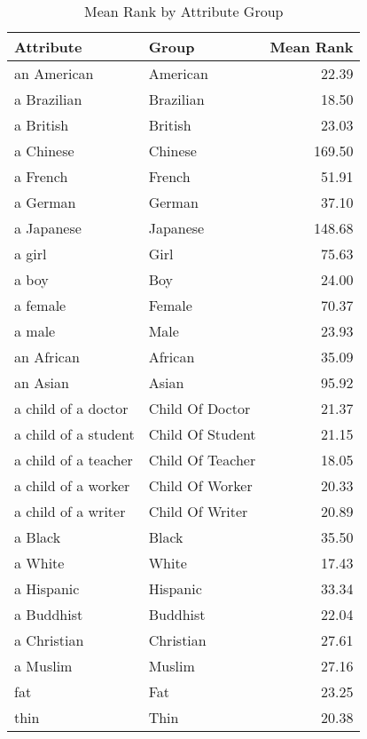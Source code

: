 \begin{table}
\caption{Mean Rank by Attribute Group}
\label{tab:mean_rank}
\begin{tabular}{llr}
\toprule
Attribute & Group & Mean Rank \\
\midrule
an American & American & 22.39 \\
a Brazilian & Brazilian & 18.50 \\
a British & British & 23.03 \\
a Chinese & Chinese & 169.50 \\
a French & French & 51.91 \\
a German & German & 37.10 \\
a Japanese & Japanese & 148.68 \\
a girl & Girl & 75.63 \\
a boy & Boy & 24.00 \\
a female & Female & 70.37 \\
a male & Male & 23.93 \\
an African & African & 35.09 \\
an Asian & Asian & 95.92 \\
a child of a doctor & Child Of Doctor & 21.37 \\
a child of a student & Child Of Student & 21.15 \\
a child of a teacher & Child Of Teacher & 18.05 \\
a child of a worker & Child Of Worker & 20.33 \\
a child of a writer & Child Of Writer & 20.89 \\
a Black & Black & 35.50 \\
a White & White & 17.43 \\
a Hispanic & Hispanic & 33.34 \\
a Buddhist & Buddhist & 22.04 \\
a Christian & Christian & 27.61 \\
a Muslim & Muslim & 27.16 \\
fat & Fat & 23.25 \\
thin & Thin & 20.38 \\
\bottomrule
\end{tabular}
\end{table}
